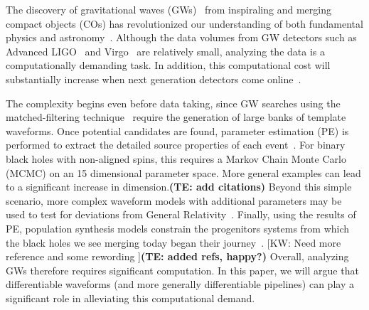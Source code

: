 \documentclass[twocolumn]{aastex631}
\newcommand{\te}[1]{\textbf{\color{pyGreen}(TE: #1)}}
\newcommand{\kw}[1]{{\color{rb4}[KW: #1 ]}}
\newcommand{\AZ}[1]{{\color{Burnt}[AZ: #1]}}
\begin{document}
The discovery of gravitational waves (GWs)~\citep{LIGOScientific:2016aoc} from inspiraling and merging compact objects (COs) has revolutionized our understanding of both fundamental physics and astronomy~\citep[e.g.][]{LIGOScientific:2021djp,LIGOScientific:2021sio,LIGOScientific:2021psn}.
Although the data volumes from GW detectors such as Advanced LIGO~\citep{LIGOScientific:2014pky} and Virgo~\citep{VIRGO:2014yos} are relatively small, analyzing the data is a computationally demanding task.
In addition, this computational cost will substantially increase when next generation detectors come online~\citep{Maggiore:2019uih, Reitze:2019iox, Evans:2021gyd}.

The complexity begins even before data taking, since GW searches using the matched-filtering technique~\citep{Owen:1998dk, Owen:1995tm} require the generation of large banks of template waveforms.
Once potential candidates are found, parameter estimation (PE) is performed to extract the detailed source properties of each event~\citep{Christensen:2022bxb, 2020MNRAS.493.3132S, Ashton:2018jfp, Romero-Shaw:2020owr, Veitch:2014wba, Biwer:2018osg}.
For binary black holes with non-aligned spins, this requires a Markov Chain Monte Carlo (MCMC) on an 15 dimensional parameter space.
More general examples can lead to a significant increase in dimension.\te{add citations}
Beyond this simple scenario, more complex waveform models with additional parameters may be used to test for deviations from General Relativity~\citep{Krishnendu:2021fga, LIGOScientific:2020tif, LIGOScientific:2016lio, Yunes:2016jcc, Arun:2006yw, Agathos:2013upa}.
Finally, using the results of PE, population synthesis models constrain the progenitors systems from which the black holes we see merging today began their journey~\citep{LIGOScientific:2020kqk, LIGOScientific:2021psn, Wong:2022flg}.
\kw{Need more reference and some rewording}\te{added refs, happy?}
Overall, analyzing GWs therefore requires significant computation.
In this paper, we will argue that differentiable waveforms (and more generally differentiable pipelines) can play a significant role in alleviating this computational demand.
\end{document}
